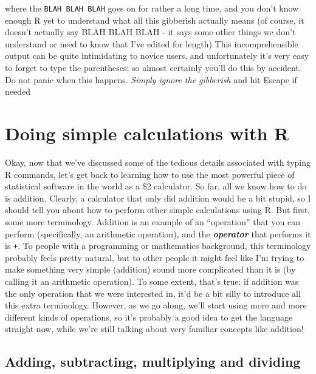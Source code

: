\documentclass[
]{book}
\begin{document}
where the \texttt{BLAH\ BLAH\ BLAH} goes on for rather a long time, and you don't know enough R yet to understand what all this gibberish actually means (of course, it doesn't actually say BLAH BLAH BLAH - it says some other things we don't understand or need to know that I've edited for length) This incomprehensible output can be quite intimidating to novice users, and unfortunately it's very easy to forget to type the parentheses; so almost certainly you'll do this by accident. Do not panic when this happens. \emph{Simply ignore the gibberish} and hit Escape if needed

\hypertarget{doing-simple-calculations-with-r}{%
\section{Doing simple calculations with R}\label{doing-simple-calculations-with-r}}

Okay, now that we've discussed some of the tedious details associated with typing R commands, let's get back to learning how to use the most powerful piece of statistical software in the world as a \$2 calculator. So far, all we know how to do is addition. Clearly, a calculator that only did addition would be a bit stupid, so I should tell you about how to perform other simple calculations using R. But first, some more terminology. Addition is an example of an ``operation'' that you can perform (specifically, an arithmetic operation), and the \textbf{\emph{operator}} that performs it is \texttt{+}. To people with a programming or mathematics background, this terminology probably feels pretty natural, but to other people it might feel like I'm trying to make something very simple (addition) sound more complicated than it is (by calling it an arithmetic operation). To some extent, that's true: if addition was the only operation that we were interested in, it'd be a bit silly to introduce all this extra terminology. However, as we go along, we'll start using more and more different kinds of operations, so it's probably a good idea to get the language straight now, while we're still talking about very familiar concepts like addition!

\hypertarget{adding-subtracting-multiplying-and-dividing}{%
\subsection{Adding, subtracting, multiplying and dividing}\label{adding-subtracting-multiplying-and-dividing}}
\end{document}
